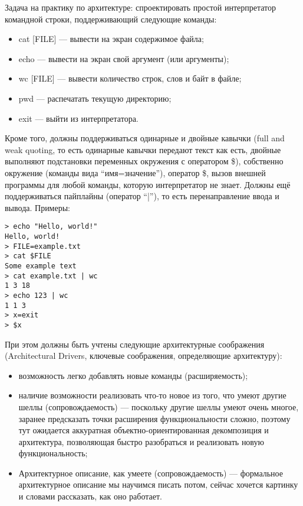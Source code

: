 \documentclass{../../text-style}
\begin{document}
\maketitle
\thispagestyle{empty}

Задача на практику по архитектуре: спроектировать простой интерпретатор командной строки, поддерживающий следующие команды:

\begin{itemize}
    \item cat [FILE] --- вывести на экран содержимое файла;
    \item echo --- вывести на экран свой аргумент (или аргументы);
    \item wc [FILE] --- вывести количество строк, слов и байт в файле;
    \item pwd --- распечатать текущую директорию;
    \item exit --- выйти из интерпретатора.
\end{itemize}

Кроме того, должны поддерживаться одинарные и двойные кавычки (full and weak quoting, то есть одинарные кавычки передают текст как есть, двойные выполняют подстановки переменных окружения с оператором \$), собственно окружение (команды вида ``имя=значение''), оператор \$, вызов внешней программы для любой команды, которую интерпретатор не знает. Должны ещё поддерживаться пайплайны (оператор ``|''), то есть перенаправление ввода и вывода. Примеры:

\begin{verbatim}
> echo "Hello, world!"
Hello, world!
> FILE=example.txt
> cat $FILE
Some example text
> cat example.txt | wc
1 3 18
> echo 123 | wc
1 1 3
> x=exit
> $x
\end{verbatim}

При этом должны быть учтены следующие архитектурные соображения (Architectural Drivers, ключевые соображения, определяющие архитектуру):

\begin{itemize}
    \item возможность легко добавлять новые команды (расширяемость);
    \item наличие возможности реализовать что-то новое из того, что умеют другие шеллы (сопровождаемость) --- поскольку другие шеллы умеют очень многое, заранее предсказать точки расширения функциональности сложно, поэтому тут ожидается аккуратная объектно-ориентированная декомпозиция и архитектура, позволяющая быстро разобраться и реализовать новую функциональность;
    \item Архитектурное описание, как умеете (сопровождаемость) --- формальное архитектурное описание мы научимся писать потом, сейчас хочется картинку и словами рассказать, как оно работает.
\end{itemize}
\end{document}
